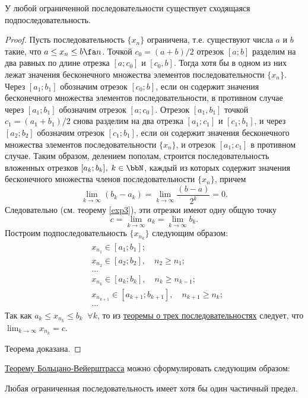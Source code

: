 \begin{thm} \label{ch1.1thm3}
\label{exp9}
 У любой ограниченной последовательности существует сходящаяся подпоследовательность.
\end{thm}
\begin{proof}
Пусть последовательность $\{x_n\}$ ограничена, т.е. существуют числа $a$ и $b$ такие, что $a \le x_n \le b \fa n$. Точкой
$c_0 = (a + b)/2$ отрезок $[a; b]$ разделим на два равных по длине отрезка $[a; c_0]$ и $[c_0,b]$. Тогда хотя бы в одном из них лежат значения бесконечного множества элементов последовательности $\{x_n\}$. Через $[a_1;b_1]$ обозначим отрезок $[c_0;b]$, если он содержит значения бесконечного множества элементов последовательности, в противном случае через $[a_1; b_1]$ обозначим отрезок $[a; c_0]$. Отрезок $[a_1, b_1]$ точкой $c_1 = (a_1 + b_1)/2$ снова разделим на два отрезка $[a_1;c_1]$ и $[c_1;b_1]$, и через $[a_2;b_2]$ обозначим отрезок $[c_1;b_1]$, если он содержит значения бесконечного множества элементов последовательности $\{x_n\}$, и отрезок $[a_1; c_1]$ в противном случае. Таким образом, делением пополам, строится последовательность вложенных отрезков $[a_k;b_k],\; k \in \bbN$, каждый из которых содержит значения бесконечного множества членов последовательности $\{x_n\}$, причем
$$
\lim_{k\to \infty}(b_k-a_k)=\lim_{k \to \infty}\frac{(b-a)}{2^k}=0.
$$
Следовательно (см. теорему \ref{exp3}), эти отрезки имеют одну общую точку
$$
c = \lim_{k \to \infty} a_k = \lim_{k \to \infty} b_k.
$$
Построим подпоследовательность $\{x_{n_k}\}$ следующим образом:
\begin{gather*}
\begin{aligned}
& x_{n_1} \in [a_1;b_1];\\
& x_{n_2} \in [a_2;b_2],\quad n_2 \ge n_1;\\
& ...\\
& x_{n_k} \in [a_k;b_k],\quad n_k \ge n_{k-1};\\
& x_{n_{k+1}} \in [a_{k+1};b_{k+1}],\quad n_{k+1} \ge n_k;\\
& ...
\end{aligned}
\end{gather*}
Так как $a_k \le x_{n_k} \le b_k \;\; \forall k$, то из \hyperref[exp10]{теоремы о трех последовательностях} следует, что $\lim_{k \to \infty}\limits x_{n_k} = c$.

Теорема доказана.
\end{proof}

\hyperref[exp9]{Теорему Больцано-Вейерштрасса} можно сформулировать следующим образом: 
\begin{thmn} Любая ограниченная последовательность имеет хотя бы один частичный предел.
\end{thmn}

